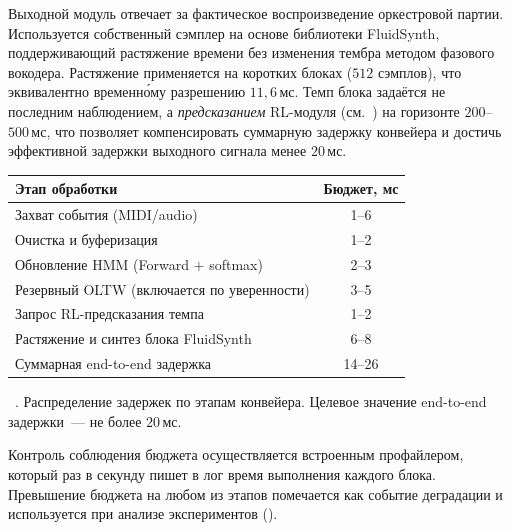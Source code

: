 Выходной модуль отвечает за фактическое воспроизведение оркестровой
партии. Используется собственный сэмплер на основе библиотеки
FluidSynth, поддерживающий растяжение времени без изменения тембра
методом фазового вокодера. Растяжение применяется на коротких блоках
($512$ сэмплов), что эквивалентно временно́му разрешению $11{,}6$\,мс.
Темп блока задаётся не последним наблюдением, а \textit{предсказанием}
RL-модуля (см.~) на горизонте $200$--$500$\,мс, что
позволяет компенсировать суммарную задержку конвейера и достичь
эффективной задержки выходного сигнала менее $20$\,мс.

\par\addvspace{2pt}
{\centering
{}%
\footnotesize
\begin{tabular}{@{}lc@{}}
  \toprule
  Этап обработки                              & Бюджет, мс \\
  \midrule
  Захват события (MIDI/audio)                 & 1--6 \\
  Очистка и буферизация                       & 1--2 \\
  Обновление HMM (Forward + softmax)          & 2--3 \\
  Резервный OLTW (включается по уверенности)  & 3--5 \\
  Запрос RL-предсказания темпа                & 1--2 \\
  Растяжение и синтез блока FluidSynth        & 6--8 \\
  \midrule
  Суммарная end-to-end задержка               & 14--26 \\
  \bottomrule
\end{tabular}\par
\vspace{2pt}
\tablename~\thetable. Распределение задержек по этапам конвейера.
Целевое значение end-to-end задержки~--- не более $20$\,мс.\par}
\addvspace{4pt}

Контроль соблюдения бюджета осуществляется встроенным профайлером,
который раз в секунду пишет в лог время выполнения каждого блока.
Превышение бюджета на любом из этапов помечается как событие
деградации и используется при анализе экспериментов
().
